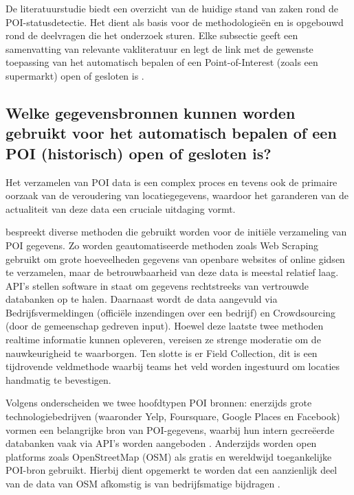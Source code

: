 
De literatuurstudie biedt een overzicht van de huidige stand van zaken rond de POI-statusdetectie. Het dient als basis voor de methodologieën en is 
opgebouwd rond de deelvragen die het onderzoek sturen. Elke subsectie geeft een samenvatting van relevante vakliteratuur en legt de link met de gewenste 
toepassing van het automatisch bepalen of een Point-of-Interest (zoals een supermarkt) open of gesloten is .

\subsection{Welke gegevensbronnen kunnen worden gebruikt voor het automatisch bepalen of een POI (historisch) open of gesloten is?}

Het verzamelen van POI data is een complex proces en tevens ook de primaire oorzaak van de veroudering van locatiegegevens, waardoor het garanderen van de actualiteit van deze data een cruciale uitdaging vormt.

\textcite{Anishma2025a} bespreekt diverse methoden die gebruikt worden voor de initiële verzameling van POI gegevens. Zo worden geautomatiseerde methoden zoals Web Scraping gebruikt om grote hoeveelheden gegevens van openbare websites of online gidsen te verzamelen, maar de betrouwbaarheid van deze data is meestal relatief laag. API's stellen software in staat om gegevens rechtstreeks van vertrouwde databanken op te halen. Daarnaast wordt de data aangevuld via Bedrijfsvermeldingen (officiële inzendingen over een bedrijf) en Crowdsourcing (door de gemeenschap gedreven input). Hoewel deze laatste twee methoden realtime informatie kunnen opleveren, vereisen ze strenge moderatie om de nauwkeurigheid te waarborgen. Ten slotte is er Field Collection, dit is een tijdrovende veldmethode waarbij teams het veld worden ingestuurd om locaties handmatig te bevestigen.

Volgens \textcite{Psyllidis2022} onderscheiden we twee hoofdtypen POI bronnen: enerzijds grote technologiebedrijven (waaronder Yelp, Foursquare, Google Places en Facebook) vormen een belangrijke bron van POI-gegevens, waarbij hun intern gecreëerde databanken vaak via API’s worden aangeboden \autocite{Psyllidis2022}. Anderzijds worden open platforms zoals OpenStreetMap (OSM) als gratis en wereldwijd toegankelijke POI-bron gebruikt. Hierbij dient opgemerkt te worden dat een aanzienlijk deel van de data van OSM afkomstig is van bedrijfsmatige bijdragen \autocite{Anderson2019}.

